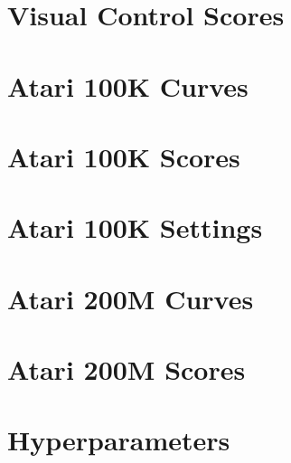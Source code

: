 \section{Visual Control Scores}

\clearpage

\section{Atari 100K Curves}

\clearpage

\section{Atari 100K Scores}

\clearpage

\section{Atari 100K Settings}

\clearpage

\thispagestyle{blank}
\section{Atari 200M Curves}
\vspace{-2ex}

\clearpage
\thispagestyle{blank}
\section{Atari 200M Scores}
\vspace{-1ex}

\restoregeometry
\clearpage

\section{Hyperparameters}

